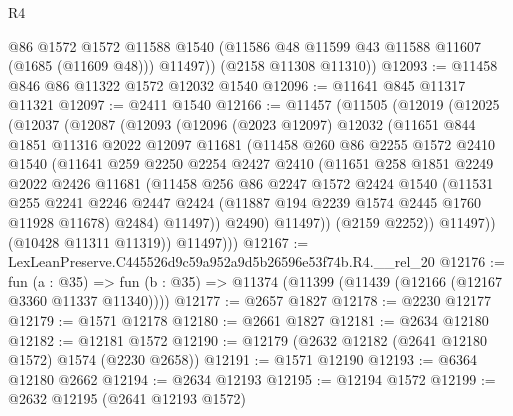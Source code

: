 \begin{lexlean}{R4}
\begin{coremodule}
          @86
          @1572
          @1572
          @11588
          @1540
          (@11586 @48 @11599 @43 @11588 @11607 (@1685 (@11609 @48)))
          @11497))
      (@2158 @11308 @11310))
@12093 := @11458 @846 @86 @11322 @1572 @12032 @1540
@12096 := @11641 @845 @11317 @11321
@12097 := @2411 @1540
@12166 := @11457
    (@11505
      (@12019
        (@12025
          (@12037
            (@12087
              (@12093
                (@12096
                  (@2023 @12097)
                  @12032
                  (@11651
                    @844
                    @1851
                    @11316
                    @2022
                    @12097
                    @11681
                    (@11458
                      @260
                      @86
                      @2255
                      @1572
                      @2410
                      @1540
                      (@11641
                        @259
                        @2250
                        @2254
                        @2427
                        @2410
                        (@11651
                          @258
                          @1851
                          @2249
                          @2022
                          @2426
                          @11681
                          (@11458
                            @256
                            @86
                            @2247
                            @1572
                            @2424
                            @1540
                            (@11531
                              @255
                              @2241
                              @2246
                              @2447
                              @2424
                              (@11887 @194 @2239 @1574 @2445 @1760 @11928 @11678)
                              @2484)
                            @11497))
                        @2490)
                      @11497))
                  (@2159 @2252))
                @11497))
            (@10428 @11311 @11319))
          @11497)))
@12167 := LexLeanPreserve.C445526d9c59a952a9d5b26596e53f74b.R4.__rel_20
@12176 := fun (a : @35) =>
  fun (b : @35) => @11374 (@11399 (@11439 (@12166 (@12167 @3360 @11337 @11340))))
@12177 := @2657 @1827
@12178 := @2230 @12177
@12179 := @1571 @12178
@12180 := @2661 @1827
@12181 := @2634 @12180
@12182 := @12181 @1572
@12190 := @12179 (@2632 @12182 (@2641 @12180 @1572) @1574 (@2230 @2658))
@12191 := @1571 @12190
@12193 := @6364 @12180 @2662
@12194 := @2634 @12193
@12195 := @12194 @1572
@12199 := @2632 @12195 (@2641 @12193 @1572)

\end{coremodule}
\end{lexlean}
